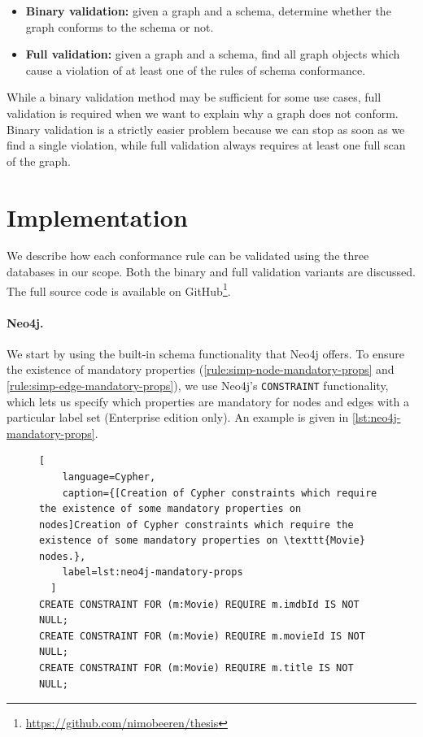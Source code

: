 \documentclass{report}
\theoremstyle{definition}
\begin{document}
\begin{itemize}
  \item \textbf{Binary validation:} given a graph and a schema, determine whether the graph conforms to the schema or not.
  \item \textbf{Full validation:} given a graph and a schema, find all graph objects which cause a violation of at least one of the rules of schema conformance.
\end{itemize}

While a binary validation method may be sufficient for some use cases, full validation is required when we want to explain why a graph does not conform. Binary validation is a strictly easier problem because we can stop as soon as we find a single violation, while full validation always requires at least one full scan of the graph.


\section{Implementation}
\label{sec:implementation}

We describe how each conformance rule can be validated using the three databases in our scope. Both the binary and full validation variants are discussed. The full source code is available on GitHub\footnote{\url{https://github.com/nimobeeren/thesis}}.

\paragraph{Neo4j.} We start by using the built-in schema functionality that Neo4j offers. To ensure the existence of mandatory properties (\autoref{rule:simp-node-mandatory-props} and \ref{rule:simp-edge-mandatory-props}), we use Neo4j's \texttt{CONSTRAINT} functionality, which lets us specify which properties are mandatory for nodes and edges with a particular label set (Enterprise edition only). An example is given in \autoref{lst:neo4j-mandatory-props}.

\begin{figure}[H]
  \begin{lstlisting}[
    language=Cypher,
    caption={[Creation of Cypher constraints which require the existence of some mandatory properties on nodes]Creation of Cypher constraints which require the existence of some mandatory properties on \texttt{Movie} nodes.},
    label=lst:neo4j-mandatory-props
  ]
CREATE CONSTRAINT FOR (m:Movie) REQUIRE m.imdbId IS NOT NULL;
CREATE CONSTRAINT FOR (m:Movie) REQUIRE m.movieId IS NOT NULL;
CREATE CONSTRAINT FOR (m:Movie) REQUIRE m.title IS NOT NULL;
  \end{lstlisting}
\end{figure}
\end{document}
